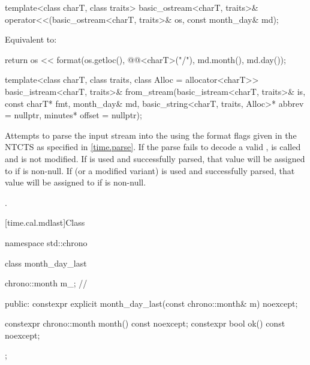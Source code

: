 %
\begin{itemdecl}
template<class charT, class traits>
  basic_ostream<charT, traits>&
    operator<<(basic_ostream<charT, traits>& os, const month_day& md);
\end{itemdecl}

\begin{itemdescr}
\pnum
\effects
Equivalent to:
\begin{codeblock}
return os << format(os.getloc(), @@<charT>("{}/{}"),
                    md.month(), md.day());
\end{codeblock}
\end{itemdescr}

%
\begin{itemdecl}
template<class charT, class traits, class Alloc = allocator<charT>>
  basic_istream<charT, traits>&
    from_stream(basic_istream<charT, traits>& is, const charT* fmt,
                month_day& md, basic_string<charT, traits, Alloc>* abbrev = nullptr,
                minutes* offset = nullptr);
\end{itemdecl}

\begin{itemdescr}
\pnum
\effects
Attempts to parse the input stream 
into the   using
the format flags given in the NTCTS 
as specified in \ref{time.parse}.
If the parse fails to decode a valid ,
 is called and
 is not modified.
If  is used and successfully parsed,
that value will be assigned to  if  is non-null.
If  (or a modified variant) is used and successfully parsed,
that value will be assigned to  if  is non-null.

\pnum
\returns
{}.
\end{itemdescr}

[time.cal.mdlast]{Class }

\begin{codeblock}
namespace std::chrono {
  class month_day_last {
    chrono::month m_;                   // \expos

  public:
    constexpr explicit month_day_last(const chrono::month& m) noexcept;

    constexpr chrono::month month() const noexcept;
    constexpr bool ok() const noexcept;
  };
}
\end{codeblock}

